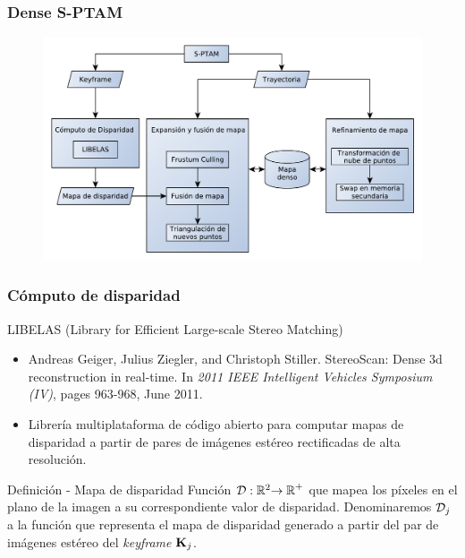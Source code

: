 \begin{frame}

\frametitle{Dense S-PTAM}
\begin{figure}[htb]
	\centering
	\includegraphics[width=1.0\columnwidth]{method/metodo-diagram.pdf}
	\hfill
\end{figure}

\end{frame}


\begin{frame}
\frametitle{Cómputo de disparidad}

\begin{block}{LIBELAS (Library for Efficient Large-scale Stereo Matching)}
\begin{itemize}
\item Andreas Geiger, Julius Ziegler, and Christoph Stiller. StereoScan: Dense 3d reconstruction in real-time. In \textit{2011 IEEE Intelligent Vehicles Symposium (IV)}, pages 963-968, June 2011.
\item Librería multiplataforma de código abierto para computar mapas de disparidad a partir de pares de imágenes estéreo rectificadas de alta resolución.
\end{itemize}
\end{block}

\begin{block}{Definición - Mapa de disparidad}
Función $\mathcal D:\mathbb{R}^{2}\mathbb{\rightarrow R}^{+}$ que mapea los píxeles en el plano de la imagen a su correspondiente valor de disparidad. Denominaremos $\mathcal D_{j}$ a la función que representa el mapa de disparidad generado a partir del par de imágenes estéreo del \emph{keyframe} $\boldsymbol{\mathbf{K}}_{j}$.
\end{block}

\end{frame}


